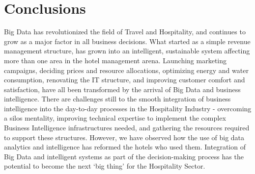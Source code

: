 \documentclass[sigconf]{acmart}
\begin{document}
\section{Conclusions}
Big Data has revolutionized the field of Travel and Hospitality, and continues to grow as a major factor in all business decisions. What started as a simple revenue management structure, has grown into an intelligent, sustainable system affecting more than one area in the hotel management arena. Launching marketing campaigns, deciding prices and resource allocations, optimizing energy and water consumption, renovating the IT structure, and improving customer comfort and satisfaction, have all been transformed by the arrival of Big Data and business intelligence. There are challenges still to the smooth integration of business intelligence into the day-to-day processes in the Hospitality Industry - overcoming a silos mentality, improving technical expertise to implement the complex Business Intelligence infrastructures needed, and gathering the resources required to support these structures. However, we have observed how the use of big data analytics and intelligence has reformed the hotels who used them. Integration of Big Data and intelligent systems as part of the decision-making process has the potential to become the next `big thing' for the Hospitality Sector.


 


\end{document}
